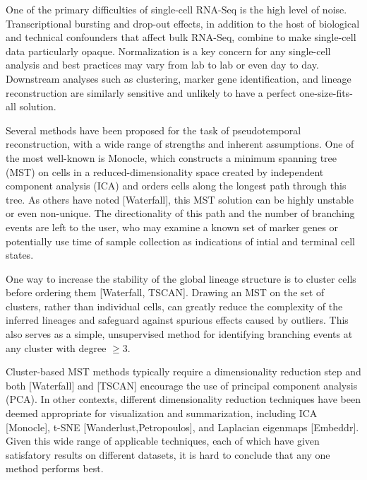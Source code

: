 \documentclass[11pt]{article}\usepackage[]{graphicx}\usepackage[]{color}
\begin{document}
One of the primary difficulties of single-cell RNA-Seq is the high level of noise. Transcriptional bursting and drop-out effects, in addition to the host of biological and technical confounders that affect bulk RNA-Seq, combine to make single-cell data particularly opaque. Normalization is a key concern for any single-cell analysis and best practices may vary from lab to lab or even day to day. Downstream analyses such as clustering, marker gene identification, and lineage reconstruction are similarly sensitive and unlikely to have a perfect one-size-fits-all solution. 

Several methods have been proposed for the task of pseudotemporal reconstruction, with a wide range of strengths and inherent assumptions. One of the most well-known is Monocle, which constructs a minimum spanning tree (MST) on cells in a reduced-dimensionality space created by independent component analysis (ICA) and orders cells along the longest path through this tree. As others have noted [Waterfall], this MST solution can be highly unstable or even non-unique. The directionality of this path and the number of branching events are left to the user, who may examine a known set of marker genes or potentially use time of sample collection as indications of intial and terminal cell states.


One way to increase the stability of the global lineage structure is to cluster cells before ordering them [Waterfall, TSCAN]. Drawing an MST on the set of clusters, rather than individual cells, can greatly reduce the complexity of the inferred lineages and safeguard against spurious effects caused by outliers. This also serves as a simple, unsupervised method for identifying branching events at any cluster with degree $\geq 3$.

Cluster-based MST methods typically require a dimensionality reduction step and both [Waterfall] and [TSCAN] encourage the use of principal component analysis (PCA). In other contexts, different dimensionality reduction techniques have been deemed appropriate for visualization and summarization, including ICA [Monocle], t-SNE [Wanderlust,Petropoulos], and Laplacian eigenmaps [Embeddr]. Given this wide range of applicable techniques, each of which have given satisfatory results on different datasets, it is hard to conclude that any one method performs best.
\end{document}
